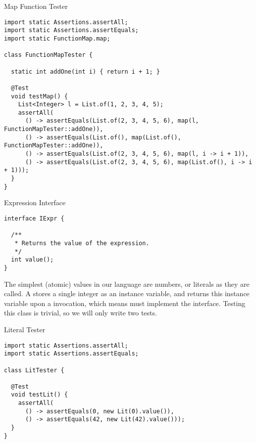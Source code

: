 \begin{cl}{Map Function Tester}
\begin{lstlisting}[language=MyJava]
import static Assertions.assertAll;
import static Assertions.assertEquals;
import static FunctionMap.map;

class FunctionMapTester {

  static int addOne(int i) { return i + 1; }

  @Test
  void testMap() {
    List<Integer> l = List.of(1, 2, 3, 4, 5);
    assertAll(
      () -> assertEquals(List.of(2, 3, 4, 5, 6), map(l, FunctionMapTester::addOne)),
      () -> assertEquals(List.of(), map(List.of(), FunctionMapTester::addOne)),
      () -> assertEquals(List.of(2, 3, 4, 5, 6), map(l, i -> i + 1)),
      () -> assertEquals(List.of(2, 3, 4, 5, 6), map(List.of(), i -> i + 1)));
  }
}
\end{lstlisting}
\end{cl}


\begin{cl}{Expression Interface}
\begin{lstlisting}[language=MyJava]
interface IExpr {

  /**
   * Returns the value of the expression.
   */
  int value();
}
\end{lstlisting}
\end{cl}

The simplest (atomic) values in our language are numbers, or literals as they are called. A  stores a single integer as an instance variable, and returns this instance variable upon a  invocation, which means  must implement the  interface. Testing this class is trivial, so we will only write two tests.

\begin{cl}{Literal Tester}
\begin{lstlisting}[language=MyJava]
import static Assertions.assertAll;
import static Assertions.assertEquals;

class LitTester {

  @Test
  void testLit() {
    assertAll(
      () -> assertEquals(0, new Lit(0).value()),      
      () -> assertEquals(42, new Lit(42).value()));
  }
}
\end{lstlisting}
\end{cl}


